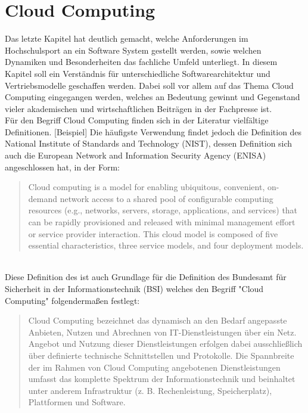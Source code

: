 \chapter{Cloud Computing} 
\label{ch:cloud}
Das letzte Kapitel hat deutlich gemacht, welche Anforderungen im Hochschulsport an ein Software System gestellt werden, sowie welchen Dynamiken und Besonderheiten das fachliche Umfeld unterliegt. In diesem Kapitel soll ein Verständnis für unterschiedliche Softwarearchitektur und Vertriebsmodelle geschaffen werden. Dabei soll vor allem auf das Thema Cloud Computing eingegangen werden, welches an Bedeutung gewinnt und Gegenstand vieler akademischen und wirtschaftlichen Beiträgen in der Fachpresse ist. 
\\

Für den Begriff Cloud Computing finden sich in der Literatur vielfältige Definitionen. [Beispiel] Die häufigste Verwendung findet jedoch die Definition des National Institute of Standards and Technology (NIST), dessen Definition sich auch die European Network and Information Security Agency (ENISA) angeschlossen hat, in der Form:

\begin{quote}
	Cloud computing is a model for enabling ubiquitous, convenient, on-demand network access to a shared pool of configurable computing resources (e.g., networks, servers, storage, applications, and services) that can be rapidly provisioned and released with minimal management effort or service provider interaction. This cloud model is composed of five essential characteristics, three service models, and four deployment models.
\end{quote} \cite*[vgl.][S.2]{Mell.2011}\\

Diese Definition des ist auch Grundlage für die Definition des Bundesamt für Sicherheit in der Informationstechnik (BSI) welches den Begriff "Cloud Computing" folgendermaßen festlegt:
\begin{quote}
	Cloud Computing bezeichnet das dynamisch an den Bedarf angepasste Anbieten, Nutzen und Abrechnen von IT-Dienstleistungen über ein Netz. Angebot und Nutzung dieser Dienstleistungen erfolgen dabei ausschließlich über definierte technische Schnittstellen und Protokolle. Die Spannbreite der im Rahmen von Cloud Computing angebotenen Dienstleistungen umfasst das komplette Spektrum der Informationstechnik und beinhaltet unter anderem Infrastruktur (z. B. Rechenleistung, Speicherplatz), Plattformen und Software.
\end{quote} \cite*[vgl.][]{BundesamtfurSicherheitinderInformationstechnik.}

